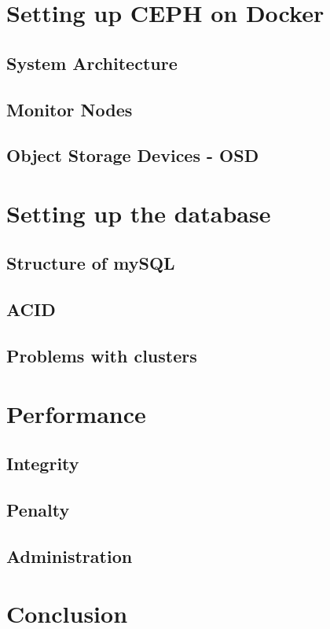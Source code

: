 \documentclass[titlepage, a4paper, 11pt]{scrartcl}
\begin{document}
    \section{Setting up CEPH on Docker}

        \subsection{System Architecture}

        \subsection{Monitor Nodes}

        \subsection{Object Storage Devices - OSD}
        
    \section{Setting up the database}

        \subsection{Structure of mySQL}

        \subsection{ACID}

        \subsection{Problems with clusters}

    \section{Performance}

        \subsection{Integrity}

        \subsection{Penalty}

        \subsection{Administration}

    \section{Conclusion}        

            
    
\end{document}
